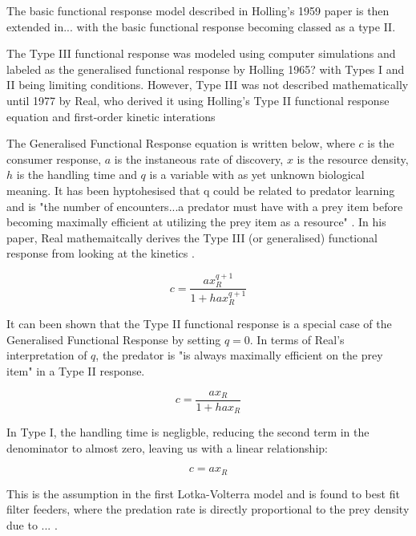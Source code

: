 \documentclass[11pt, a4paper, titlepage]{article}
\begin{document}
The basic functional response model described in Holling's 1959  paper is then extended in...\parencite{something} with the basic functional response becoming classed as a type II.

The Type III functional response was modeled using computer simulations and labeled as the generalised functional response by Holling 1965? \parencite{Holling1965} with Types I and II being limiting conditions. However, Type III was not described mathematically until 1977 by Real, who derived it using Holling's Type II functional response equation and first-order kinetic interations \parencite{Real1977}
 
The Generalised Functional Response equation is written below, where $c$ is the consumer response, $a$ is the instaneous rate of discovery, $x$ is the resource density, $h$ is the handling time and $q$ is a variable with as yet unknown biological meaning. It has been hyptohesised that q could be related to predator learning and is "the number of encounters...a predator must have with a prey item before becoming maximally efficient at utilizing the prey item as a resource" \parencite{Real1977}. In his paper, Real mathemaitcally derives the Type III (or generalised) functional response from looking at the kinetics \parencite{Real1977}.

\begin{equation}
c = \frac{ax_R^{q + 1}}{1 + hax_R^{q + 1}}
\end{equation}

It can been shown that the Type II functional response is a special case of the Generalised Functional Response by setting $q = 0$. In terms of Real's interpretation of $q$, the predator is "is always maximally efficient on the prey item"  \parencite{Real1977} in a Type II response.

\begin{equation}
c = \frac{ax_R}{1 + hax_R}
\end{equation}

 In Type I, the handling time is negligble, reducing the second term in the denominator to almost zero, leaving us with a linear relationship:

\begin{equation}
c = ax_R
\end{equation}

This is the assumption in the first Lotka-Volterra model and is found to best fit filter feeders, where the predation rate is directly  proportional to the prey density due to ... \parencite{Jeschke2004}.
\end{document}
